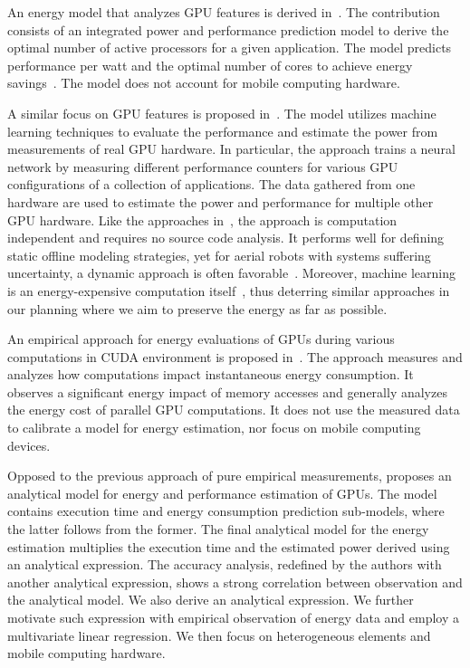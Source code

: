 An energy model that analyzes GPU features is derived in~\citep{hong2010integrated}. The contribution consists of an integrated power and performance prediction model to derive the optimal number of active processors for a given application. The model predicts performance per watt and the optimal number of cores to achieve energy savings~\citep{hong2010integrated}. The model does not account for mobile computing hardware.

A similar focus on GPU features is proposed in~\citep{wu2015gpgpu}.  The model utilizes machine learning techniques to evaluate the performance and estimate the power from measurements of real GPU hardware. In particular, the approach trains a neural network by measuring different performance counters for various GPU configurations of a collection of applications. The data gathered from one hardware are used to estimate the power and performance for multiple other GPU hardware. Like the approaches in~, the approach is computation independent and requires no source code analysis. It performs well for defining static offline modeling strategies, yet for aerial robots with systems suffering uncertainty, a dynamic approach is often favorable~\citep{seewald2019coarse}. Moreover, machine learning is an energy-expensive computation itself~\citep{garcia2019estimation,yang2017method}, thus deterring similar approaches in our planning where we aim to preserve the energy as far as possible.

An empirical approach for energy evaluations of GPUs during various computations in CUDA environment is proposed in~\citep{collange2009power}. The approach measures and analyzes how computations impact instantaneous energy consumption. It observes a significant energy impact of memory accesses and generally analyzes the energy cost of parallel GPU computations. It does not use the measured data to calibrate a model for energy estimation, nor focus on mobile computing devices.

Opposed to the previous approach of pure empirical measurements, \citep{luo2011performance} proposes an analytical model for energy and performance estimation of GPUs. The model contains execution time and energy consumption prediction sub-models, where the latter follows from the former. The final analytical model for the energy estimation multiplies the execution time and the estimated power derived using an analytical expression. The accuracy analysis, redefined by the authors with another analytical expression, shows a strong correlation between observation and the analytical model. We also derive an analytical expression. We further motivate such expression with empirical observation of energy data and employ a multivariate linear regression. We then focus on heterogeneous elements and mobile computing hardware.

